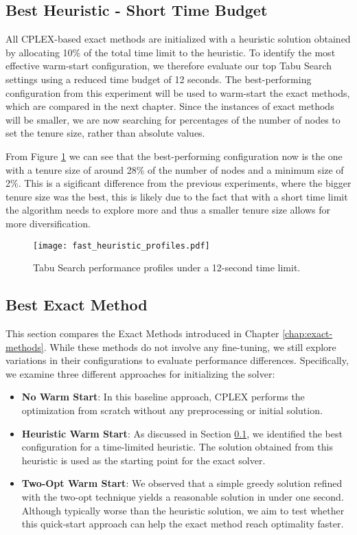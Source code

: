 \subsection{Best Heuristic - Short Time Budget}
\label{ssec:short-heuristic}
All CPLEX-based exact methods are initialized with a heuristic solution obtained by allocating 10\% of the total time limit to the heuristic. To identify the most effective warm-start configuration, we therefore evaluate our top Tabu Search settings using a reduced time budget of 12 seconds. The best-performing configuration from this experiment will be used to warm-start the exact methods, which are compared in the next chapter. Since the instances of exact methods will be smaller, we are now searching for percentages of the number of nodes to set the tenure size, rather than absolute values.

From Figure \ref{fig:fast-heuristic} we can see that the best-performing configuration now is the one with a tenure size of around 28\% of the number of nodes and a minimum size of 2\%. This is a sigificant difference from the previous experiments, where the bigger tenure size was the best, this is likely due to the fact that with a short time limit the algorithm needs to explore more and thus a smaller tenure size allows for more diversification.

\begin{figure}[H]
  \centering
  \texttt{[image: fast\_heuristic\_profiles.pdf]}
  \caption{Tabu Search performance profiles under a 12-second time limit.}
  \label{fig:fast-heuristic}
\end{figure}

\subsection{Best Exact Method}

This section compares the Exact Methods introduced in Chapter \ref{chap:exact-methods}. While these methods do not involve any fine-tuning, we still explore variations in their configurations to evaluate performance differences. Specifically, we examine three different approaches for initializing the solver:

\begin{itemize}
\item \textbf{No Warm Start}: In this baseline approach, CPLEX performs the optimization from scratch without any preprocessing or initial solution.
\item \textbf{Heuristic Warm Start}: As discussed in Section \ref{ssec:short-heuristic}, we identified the best configuration for a time-limited heuristic. The solution obtained from this heuristic is used as the starting point for the exact solver.
\item \textbf{Two-Opt Warm Start}: We observed that a simple greedy solution refined with the two-opt technique yields a reasonable solution in under one second. Although typically worse than the heuristic solution, we aim to test whether this quick-start approach can help the exact method reach optimality faster.
\end{itemize}

